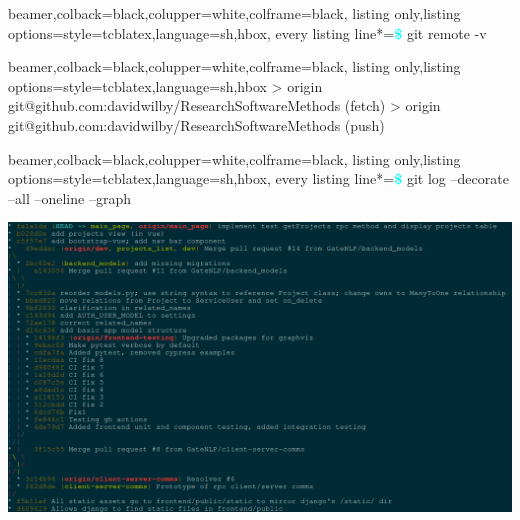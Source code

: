 \documentclass{beamer} %
\begin{document}
  \begin{frame}[fragile]
    
    \begin{tcblisting}{beamer,colback=black,colupper=white,colframe=black,
      listing only,listing options={style=tcblatex,language=sh},hbox,
      every listing line*={\textcolor{cyan}{\small\ttfamily\bfseries\$}}}
  git remote -v
    \end{tcblisting}
    
    \begin{tcblisting}{beamer,colback=black,colupper=white,colframe=black,
      listing only,listing options={style=tcblatex,language=sh},hbox}
> origin git@github.com:davidwilby/ResearchSoftwareMethods (fetch)
> origin git@github.com:davidwilby/ResearchSoftwareMethods (push)
    \end{tcblisting}

  \end{frame}

  \begin{frame}[fragile]
    \begin{tcblisting}{beamer,colback=black,colupper=white,colframe=black,
      listing only,listing options={style=tcblatex,language=sh},hbox,
      every listing line*={\textcolor{cyan}{\small\ttfamily\bfseries\$}}}
  git log --decorate --all --oneline --graph
    \end{tcblisting}
    \includegraphics[height=.9\textheight]{git_log_tree_output.png}
  \end{frame}
\end{document}
